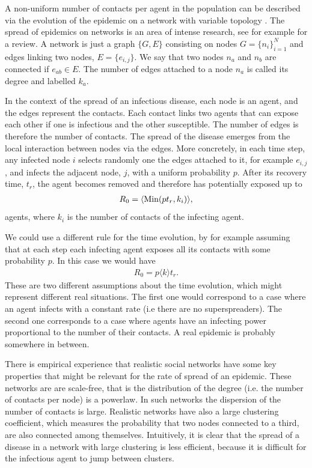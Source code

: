 \documentclass[a4paper,oneside,11pt]{article}
\begin{document}
A non-uniform number of contacts per agent in the population can be described via the evolution of the epidemic on a network with variable topology \cite{Albert_2002}. The spread of epidemics on networks is an area of intense research, see for example \cite{Pastor_Satorras_2015}
for a review. 
A network is just a graph \(\{G,E\}\)
consisting on
nodes \(G=\{n_i\}_{i=1}^N\) and edges linking two nodes, \(E=\{e_{i,j}\}\). We say that
two nodes \(n_a\) and \(n_b\) are connected if \(e_{ab}\in E\). The number
of edges attached to a node \(n_a\) is called its degree and labelled
\(k_a\).

In the context of the spread of an infectious disease, each node is
an agent, and the edges represent the contacts. Each contact links two agents that can expose each other if one is infectious and the other susceptible. The number of edges is therefore the number of contacts. The spread of the disease emerges from the local interaction between nodes via the edges. More concretely, in each time step, any infected node $i$ selects randomly one the edges attached to it, for example $e_{i,j}$, and infects the adjacent node, $j$, with a uniform probability $p$.
After its recovery time, $t_r$, the agent becomes removed and therefore has potentially exposed up to  
\begin{eqnarray}
R_0 = \langle {\rm Min}(p t_r, k_i)\rangle,
\label{eq:r0aa}
\end{eqnarray}
agents, where $k_i$ is the number of contacts of the infecting agent. 
 
 We could use a different rule for the time evolution, by for example assuming that at each step each infecting agent exposes all its contacts with some probability $p$. In this case we would have
 \begin{eqnarray}
 R_0= p \langle k\rangle t_r. 
 \label{eq:r0jj}
 \end{eqnarray}
These are two different assumptions about the time evolution, which might represent different real situations. The first one would correspond to a case where an agent infects with a constant rate (i.e there are no superspreaders). The second one corresponds to a case where agents have an infecting power proportional to the number of their contacts. A real epidemic is probably somewhere in between.

 There is empirical experience that realistic social networks have some key properties that might be relevant for the rate of spread of an epidemic.  These networks are are scale-free, that is the distribution of the degree (i.e. the number of contacts per node) is a powerlaw. 
   In such networks the dispersion of the number of contacts is large. Realistic networks have also a large clustering coefficient, which measures the probability that two nodes connected to a third, are also connected among themselves. Intuitively, it is clear that the spread of a disease in a network with large clustering is less efficient, because it is difficult for the infectious agent to jump between clusters.
\end{document}

